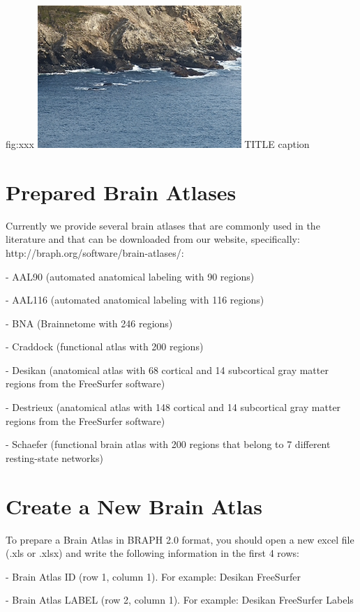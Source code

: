 \documentclass{tufte-handout}
\begin{document}
	{fig:xxx}
	{\includegraphics{tut_ba/fig1.png}}
	{TITLE}
	{
	caption
	}


\clearpage
\section{Prepared Brain Atlases}

Currently we provide several brain atlases that are commonly used in the literature and that can be downloaded from our website, specifically: http://braph.org/software/brain-atlases/:


- AAL90 (automated anatomical labeling with 90 regions)


- AAL116 (automated anatomical labeling with 116 regions)


- BNA (Brainnetome with 246 regions)


- Craddock (functional atlas with 200 regions)


- Desikan (anatomical atlas with 68 cortical and 14 subcortical gray matter regions from the FreeSurfer software)


-  Destrieux (anatomical atlas with 148 cortical and 14 subcortical gray matter regions from the FreeSurfer software)


- Schaefer (functional brain atlas with 200 regions that belong to 7 different resting-state networks)


\section{Create a New Brain Atlas}

To prepare a Brain Atlas in BRAPH 2.0 format, you should open a new excel file (.xls or .xlsx) and write the following information in the first 4 rows:

- Brain Atlas ID (row 1, column 1).
For example: Desikan FreeSurfer


- Brain Atlas LABEL (row 2, column 1).
For example: Desikan FreeSurfer Labels
\end{document}
